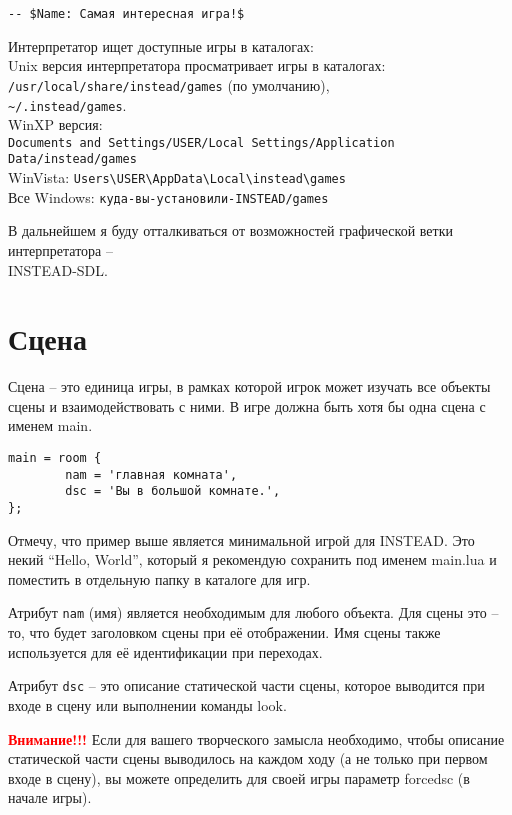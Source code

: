 \documentclass[a4paper,12pt]{article}
\begin{document}
\begin{verbatim}
-- $Name: Самая интересная игра!$
\end{verbatim}

Интерпретатор ищет доступные игры в каталогах:\\
Unix версия интерпретатора просматривает игры в каталогах:\\
\verb;/usr/local/share/instead/games; (по умолчанию),\\
\verb,~/.instead/games,.\\
WinXP версия:\\
\verb;Documents and Settings/USER/Local Settings/Application Data/instead/games;\\
WinVista: \verb;Users\USER\AppData\Local\instead\games;\\
Все Windows: \verb;куда-вы-установили-INSTEAD/games;

В дальнейшем я буду отталкиваться от возможностей графической ветки интерпретатора -- \\ INSTEAD-SDL.

\section{Сцена}

Сцена -- это единица игры, в рамках которой игрок может изучать все объекты сцены и взаимодействовать с ними. В игре должна быть хотя бы одна сцена с именем main.

\begin{verbatim}
main = room {
        nam = 'главная комната',
        dsc = 'Вы в большой комнате.',
};
\end{verbatim}

Отмечу, что пример выше является минимальной игрой для INSTEAD. Это некий ``Hello, World'', который я рекомендую сохранить под именем main.lua и поместить в отдельную папку в каталоге для игр.

Атрибут \verb/nam/ (имя) является необходимым для любого объекта. Для сцены это -- то, что будет заголовком сцены при её отображении. Имя сцены также используется для её идентификации при переходах.

Атрибут \verb/dsc/ -- это описание статической части сцены, которое выводится при входе в сцену или выполнении команды look.

\textbf{\textcolor{red}{Внимание!!!}} Если для вашего творческого замысла необходимо, чтобы описание статической части сцены выводилось на каждом ходу (а не только при первом входе в сцену), вы можете определить для своей игры параметр forcedsc (в начале игры).
\end{document}
